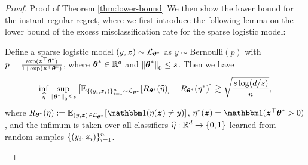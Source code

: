 \begin{proof}{Proof of Theorem \ref{thm:lower-bound}}
	We then show the lower bound for the instant regular regret, where we first introduce the following lemma on the lower bound of the excess misclassification rate for the sparse logistic model:
	\begin{lemma}[\cite{abramovich2018high}, Section \uppercase\expandafter{\romannumeral 6\relax}]\label{lem:risk-lower-bound}
		Define a sparse logistic model $(y, \boldsymbol{z}) \sim {\cal L}_{\boldsymbol{\theta}^*}$ as $y  \sim \mathrm{Bernoulli}(p)$ with $p=\frac{\exp(\boldsymbol{z}^{\top}\boldsymbol{\theta}^*)}{1+\exp(\boldsymbol{z}^{\top}\boldsymbol{\theta}^*)}$, where $\boldsymbol{\theta}^*\in \mathbb{R}^d$ and $\left\lVert\boldsymbol{\theta}^*\right\rVert_0 \leq s$. Then we have
		\[\inf_{\widehat\eta}\sup_{\left\lVert\boldsymbol{\theta}^*\right\rVert_0 \leq s} \big[\mathbb{E}_{\{(y_i, \boldsymbol{z}_i)\}_{i=1}^n \sim {\cal L}_{\boldsymbol{\theta}^*}}[R_{\boldsymbol{\theta}^*}(\widehat\eta)]-R_{\boldsymbol{\theta}^*}(\eta^*)\big] \gtrsim \sqrt{\frac{s\log(d/s)}{n}},\]
		where $R_{\btheta^*}(\eta):=\EE_{(y, \bz) \in \calL_{\btheta^*}}[\one(\eta(\bz) \neq y)]$, $\eta^*(\bz)=\one(\bz^{\top}\btheta^*>0)$, and the infimum is taken over all classifiers $\widehat\eta: \mathbb{R}^d \to \{0, 1\}$ learned from random samples $\{(y_i, \boldsymbol{z}_i)\}_{i=1}^n$.
	\end{lemma}


\end{proof}
